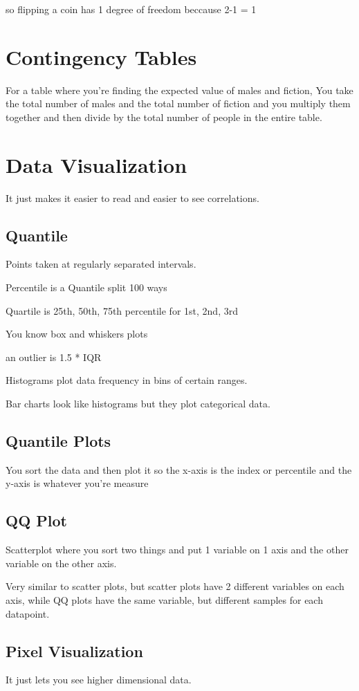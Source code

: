 \documentclass[fleqn]{report}
\begin{document}
so flipping a coin has 1 degree of freedom beccause 2-1 = 1

\section{Contingency Tables}
For a table where you're finding the expected value of males and fiction,
You take the total number of males and the total number of fiction 
and you multiply them together and then divide by the total number of 
people in the entire table.

\section{Data Visualization}
It just makes it easier to read and easier to see correlations. 

\subsection{Quantile}
Points taken at regularly separated intervals. 

Percentile is a Quantile split 100 ways 

Quartile is 25th, 50th, 75th percentile for 1st, 2nd, 3rd

You know box and whiskers plots 

an outlier is 1.5 * IQR 

Histograms plot data frequency in bins of certain ranges.

Bar charts look like histograms but they plot categorical data. 

\subsection{Quantile Plots}
You sort the data and then plot it so the x-axis is 
the index or percentile and the y-axis is whatever you're measure 

\subsection{QQ Plot}
Scatterplot where you sort two things and put 1 variable on 1 axis 
and the other variable on the other axis. 

Very similar to scatter plots, but scatter plots have 2 different variables 
on each axis, while QQ plots have the same variable, but different samples 
for each datapoint. 

\subsection{Pixel Visualization}
It just lets you see higher dimensional data. 
\end{document}
